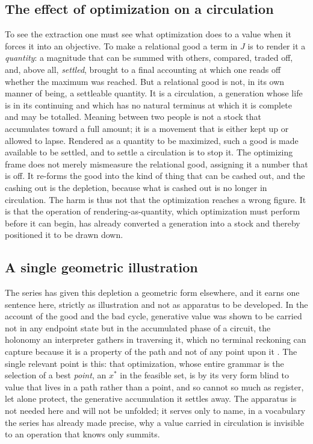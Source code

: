 \subsection*{The effect of optimization on a circulation}

To see the extraction one must see what optimization does to a value when it forces it into an objective. To make a relational good a term in $J$ is to render it a \emph{quantity}: a magnitude that can be summed with others, compared, traded off, and, above all, \emph{settled}, brought to a final accounting at which one reads off whether the maximum was reached. But a relational good is not, in its own manner of being, a settleable quantity. It is a circulation, a generation whose life is in its continuing and which has no natural terminus at which it is complete and may be totalled. Meaning between two people is not a stock that accumulates toward a full amount; it is a movement that is either kept up or allowed to lapse. Rendered as a quantity to be maximized, such a good is made available to be settled, and to settle a circulation is to stop it. The optimizing frame does not merely mismeasure the relational good, assigning it a number that is off. It re-forms the good into the kind of thing that can be cashed out, and the cashing out is the depletion, because what is cashed out is no longer in circulation. The harm is thus not that the optimization reaches a wrong figure. It is that the operation of rendering-as-quantity, which optimization must perform before it can begin, has already converted a generation into a stock and thereby positioned it to be drawn down.

\subsection*{A single geometric illustration}

The series has given this depletion a geometric form elsewhere, and it earns one sentence here, strictly as illustration and not as apparatus to be developed. In the account of the good and the bad cycle, generative value was shown to be carried not in any endpoint state but in the accumulated phase of a circuit, the holonomy an interpreter gathers in traversing it, which no terminal reckoning can capture because it is a property of the path and not of any point upon it \parencite{paperix}. The single relevant point is this: that optimization, whose entire grammar is the selection of a best \emph{point}, an $x^{\ast}$ in the feasible set, is by its very form blind to value that lives in a path rather than a point, and so cannot so much as register, let alone protect, the generative accumulation it settles away. The apparatus is not needed here and will not be unfolded; it serves only to name, in a vocabulary the series has already made precise, why a value carried in circulation is invisible to an operation that knows only summits.

